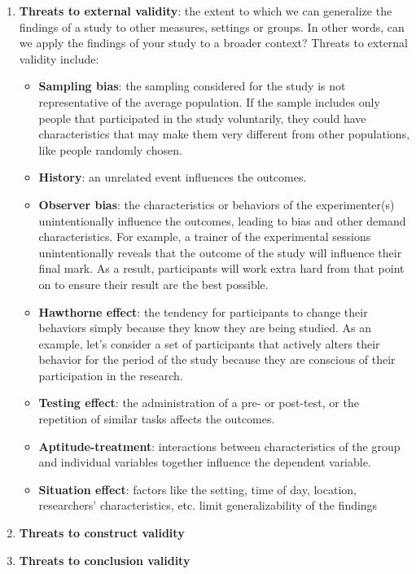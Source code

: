 \begin{enumerate}
    \item \textbf{Threats to external validity}: the extent to which we can generalize the findings of a study to other measures, settings or groups. In other words, can we apply the findings of your study to a broader context?
    Threats to external validity include: 
    \begin{itemize}
        \item \textbf{Sampling bias}: the sampling considered for the study is not representative of the average population. If the sample includes only people that participated in the study voluntarily, they could have characteristics that may make them very different from other populations, like people randomly chosen.
        \item \textbf{History}: an unrelated event influences the outcomes.
        \item \textbf{Observer bias}: the characteristics or behaviors of the experimenter(s) unintentionally influence the outcomes, leading to bias and other demand characteristics. For example, a trainer of the experimental sessions unintentionally reveals that the outcome of the study will influence their final mark. As a result, participants will work extra hard from that point on to ensure their result are the best possible.
        \item \textbf{Hawthorne effect}: the tendency for participants to change their behaviors simply because they know they are being studied. As an example, let's consider a set of participants that actively alters their behavior for the period of the study because they are conscious of their participation in the research.
        \item \textbf{Testing effect}: the administration of a pre- or post-test, or the repetition of similar tasks affects the outcomes.
        \item \textbf{Aptitude-treatment}: interactions between characteristics of the group and individual variables together influence the dependent variable.
        \item \textbf{Situation effect}: factors like the setting, time of day, location, researchers' characteristics, etc. limit generalizability of the findings
    \end{itemize}
    \item \textbf{Threats to construct validity}
    \item \textbf{Threats to conclusion validity}
\end{enumerate}

